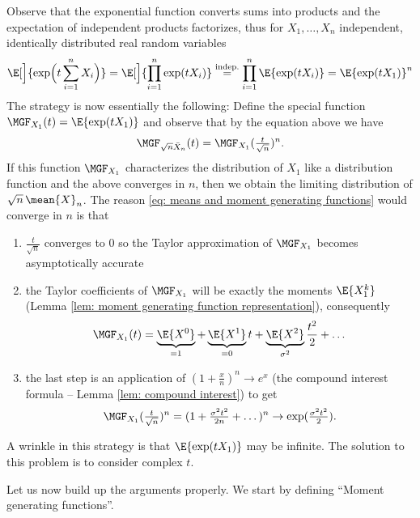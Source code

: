 Observe that the exponential function converts sums into products and the
expectation of independent products factorizes, thus for \(X_1,\dots, X_n\)
independent, identically distributed real random variables
\[
    \E[\Big]{\exp\Bigl(t\sum_{i=1}^n X_i\Bigr)} = \E[\Big]{\prod_{i=1}^n \exp(tX_i)}
    \overset{\text{indep.}}= \prod_{i=1}^n \E{\exp(tX_i)}
    = \E{\exp(tX_1)}^n
\]
The strategy is now essentially the following: Define the special function
\(\MGF_{X_1}(t) = \E{\exp(t X_1)}\) and observe that
by the equation above we have
\begin{equation}
    \label{eq: means and moment generating functions}    
    \MGF_{\sqrt{n} \bar{X}_n}(t) = \MGF_{X_1}(\tfrac{t}{\sqrt{n}})^n.
\end{equation}
If this function \(\MGF_{X_1}\) characterizes the distribution of \(X_1\) like a
distribution function and the above converges in \(n\), then we obtain the
limiting distribution of \(\sqrt{n}\,\mean{X}_n\). The reason \eqref{eq: means
and moment generating functions} would converge in \(n\) is that
\begin{enumerate}[label=\textbf{Step \arabic*:},itemindent=2em]
    \item \(\frac{t}{\sqrt{n}}\) converges to \(0\) so the Taylor approximation
    of \(\MGF_{X_1}\) becomes asymptotically accurate 
    \item the Taylor coefficients of \(\MGF_{X_1}\) will be exactly the moments
    \(\E{X_1^k}\) (Lemma \ref{lem: moment generating function representation}), consequently
    \[
        \MGF_{X_1}(t) = \underbrace{\E{X^0}}_{=1} + \underbrace{\E{X^1}}_{=0} t + \underbrace{\E{X^2}}_{\sigma^2} \frac{t^2}{2} + \dots
    \]
    \item the last step is an application of \((1+\frac{x}n)^n \to e^x\) (the
    compound interest formula -- Lemma \ref{lem: compound interest}) to get
    \[
        \MGF_{X_1}(\tfrac{t}{\sqrt{n}})^n
        = (1 + \tfrac{\sigma^2 t^2}{2n} + \dots)^n \to \exp(\tfrac{\sigma^2 t^2}2).
    \]
\end{enumerate}
A wrinkle in this strategy is that \(\E{\exp(tX_1)}\) may be infinite. The
solution to this problem is to consider complex \(t\).

Let us now build up the arguments properly. We start by
defining ``Moment generating functions''.

